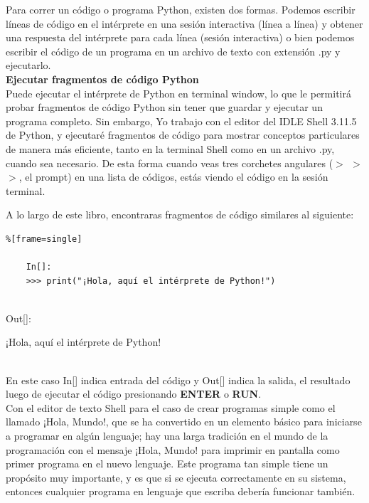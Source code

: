 Para correr un código o programa Python, existen dos formas. Podemos escribir líneas de código en el intérprete en una sesión interactiva (línea a línea)  y obtener una respuesta del intérprete para cada línea (sesión interactiva) o bien podemos escribir el código de un programa en un archivo de texto con extensión .py  y ejecutarlo.\\

{\bf{Ejecutar fragmentos de código Python}}\\

Puede ejecutar el intérprete de Python en terminal window, lo que le permitirá probar fragmentos de 
código Python sin tener que guardar y ejecutar un programa completo. Sin embargo, Yo trabajo con el editor del IDLE Shell 3.11.5 de Python, y ejecutaré  fragmentos de código para mostrar conceptos particulares de manera más eficiente, tanto en la terminal Shell como en un archivo .py, cuando sea necesario.  De esta forma cuando veas  tres corchetes angulares ({\bf{\scriptsize$>$\!\! $>$\!\! $>$}},  el prompt) en una lista de códigos, estás viendo el código en la sesión terminal. 

A lo largo de este libro, encontraras  fragmentos de código similares al siguiente:

\begin{lstlisting}%[frame=single]
	
	In[]:	
	>>> print("¡Hola, aquí el intérprete de Python!")
	
\end{lstlisting}

{\ttfamily\scriptsize\scriptsize   
	{\hspace{-0.65cm}}Out[]:{\color{blue}
		
		{\hspace{-0.65cm}}¡Hola, aquí el intérprete de Python!}} \\

En este caso  {\ttfamily In[]}  indica entrada del código y {\ttfamily Out[]} indica la salida, el resultado luego de ejecutar el código presionando {\bf\scriptsize ENTER} o {\bf\scriptsize RUN}.\\


Con el editor de texto Shell para el caso de crear  programas simple como el llamado ¡Hola, Mundo!,
que se ha convertido en un elemento básico para iniciarse a programar en algún lenguaje;  hay una larga tradición en el
mundo de la programación con  el mensaje ¡Hola, Mundo! para imprimir en pantalla como primer programa en el nuevo lenguaje. Este  
programa tan simple tiene un propósito muy importante, y es  que si se ejecuta correctamente en su sistema, entonces 
cualquier programa en lenguaje que escriba debería funcionar también.\\

